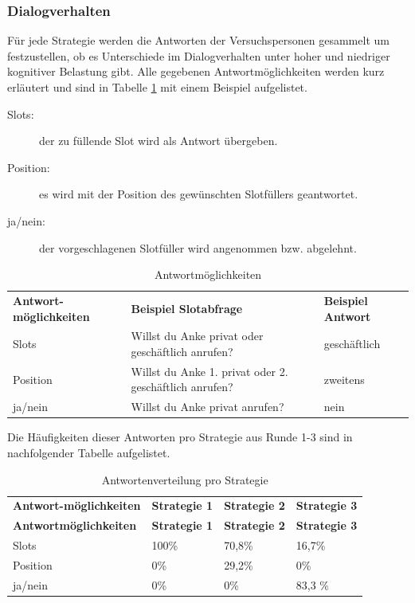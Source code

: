 \documentclass[12pt,a4paper]{scrartcl}
\begin{document}
\subsubsection{Dialogverhalten}
\label{disverh1}
Für jede Strategie werden die Antworten der Versuchspersonen gesammelt um festzustellen, ob es Unterschiede im Dialogverhalten unter hoher und niedriger kognitiver Belastung gibt. Alle gegebenen Antwortmöglichkeiten werden kurz erläutert und sind in Tabelle \ref{Dialogverhalten11} mit einem Beispiel aufgelistet.

\begin{description}
\item[Slots:] der zu füllende Slot wird als Antwort übergeben.
\item[Position:] es wird mit der Position des gewünschten Slotfüllers geantwortet.
\item[ja/nein:] der vorgeschlagenen Slotfüller wird angenommen bzw. abgelehnt.
\end{description}

\begin{longtable}{p{}p{5cm}p{}}
	\label{Dialogverhalten11}\\
	\caption[Antwortmöglichkeiten1]{Antwortmöglichkeiten}\\
	\hline
\textbf{Antwort-möglichkeiten}&\textbf{Beispiel \newline Slotabfrage}&\textbf{Beispiel \newline Antwort}\\
	\hline
Slots  & Willst du Anke privat oder geschäftlich anrufen? & geschäftlich  \\
Position & Willst du Anke 1. privat oder 2. geschäftlich anrufen? & zweitens  \\
ja/nein & Willst du Anke privat anrufen? &  nein\\ 
\hline
\end{longtable}

Die Häufigkeiten dieser Antworten pro Strategie aus Runde 1-3 sind in nachfolgender Tabelle aufgelistet.

\begin{longtable}{p{3cm}p{3cm}p{3cm}p{3cm} }
	\label{Dialogverhalten12}\\
	\caption[Antwortenverteilung pro Strategie]{Antwortenverteilung pro Strategie}\\
	\hline
\textbf{Antwort-möglichkeiten}&\textbf{Strategie 1}&\textbf{Strategie 2} &\textbf{Strategie 3}\\
	\hline
	\endfirsthead
	\hline
	\textbf{Antwortmöglichkeiten}&\textbf{Strategie 1}&\textbf{Strategie 2} &\textbf{Strategie 3}\\
	\hline
	\endhead
Slots & 100\% & 70,8\%\ & 16,7\%  \\
Position & 0\% & 29,2\% & 0\%  \\
ja/nein & 0\% & 0\%  & 83,3 \%  \\
\hline
\end{longtable}
\end{document}
